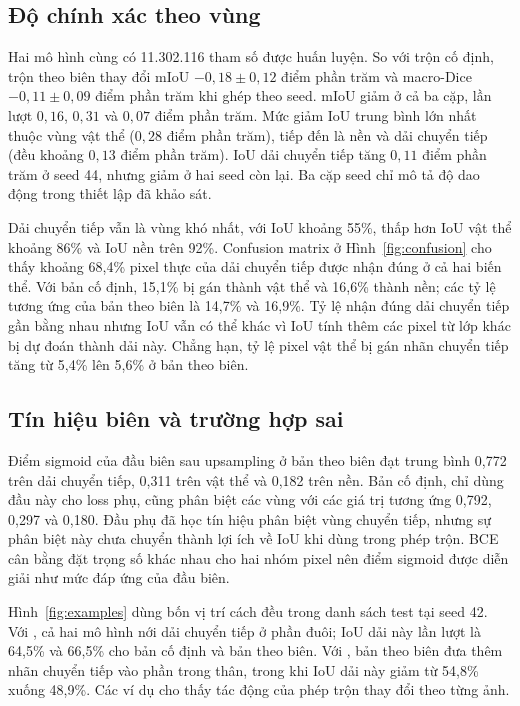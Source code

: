 \subsection{Độ chính xác theo vùng}

Hai mô hình cùng có 11.302.116 tham số được huấn luyện. So với trộn cố định, trộn theo biên thay đổi mIoU $-0{,}18\pm0{,}12$ điểm phần trăm và macro-Dice $-0{,}11\pm0{,}09$ điểm phần trăm khi ghép theo seed. mIoU giảm ở cả ba cặp, lần lượt $0{,}16$, $0{,}31$ và $0{,}07$ điểm phần trăm. Mức giảm IoU trung bình lớn nhất thuộc vùng vật thể ($0{,}28$ điểm phần trăm), tiếp đến là nền và dải chuyển tiếp (đều khoảng $0{,}13$ điểm phần trăm). IoU dải chuyển tiếp tăng $0{,}11$ điểm phần trăm ở seed 44, nhưng giảm ở hai seed còn lại. Ba cặp seed chỉ mô tả độ dao động trong thiết lập đã khảo sát.

Dải chuyển tiếp vẫn là vùng khó nhất, với IoU khoảng 55\%, thấp hơn IoU vật thể khoảng 86\% và IoU nền trên 92\%. Confusion matrix ở Hình~\ref{fig:confusion} cho thấy khoảng 68,4\% pixel thực của dải chuyển tiếp được nhận đúng ở cả hai biến thể. Với bản cố định, 15,1\% bị gán thành vật thể và 16,6\% thành nền; các tỷ lệ tương ứng của bản theo biên là 14,7\% và 16,9\%. Tỷ lệ nhận đúng dải chuyển tiếp gần bằng nhau nhưng IoU vẫn có thể khác vì IoU tính thêm các pixel từ lớp khác bị dự đoán thành dải này. Chẳng hạn, tỷ lệ pixel vật thể bị gán nhãn chuyển tiếp tăng từ 5,4\% lên 5,6\% ở bản theo biên.

\subsection{Tín hiệu biên và trường hợp sai}

Điểm sigmoid của đầu biên sau upsampling ở bản theo biên đạt trung bình 0,772 trên dải chuyển tiếp, 0,311 trên vật thể và 0,182 trên nền. Bản cố định, chỉ dùng đầu này cho loss phụ, cũng phân biệt các vùng với các giá trị tương ứng 0,792, 0,297 và 0,180. Đầu phụ đã học tín hiệu phân biệt vùng chuyển tiếp, nhưng sự phân biệt này chưa chuyển thành lợi ích về IoU khi dùng trong phép trộn. BCE cân bằng đặt trọng số khác nhau cho hai nhóm pixel nên điểm sigmoid được diễn giải như mức đáp ứng của đầu biên.

Hình~\ref{fig:examples} dùng bốn vị trí cách đều trong danh sách test tại seed 42. Với , cả hai mô hình nới dải chuyển tiếp ở phần đuôi; IoU dải này lần lượt là 64,5\% và 66,5\% cho bản cố định và bản theo biên. Với , bản theo biên đưa thêm nhãn chuyển tiếp vào phần trong thân, trong khi IoU dải này giảm từ 54,8\% xuống 48,9\%. Các ví dụ cho thấy tác động của phép trộn thay đổi theo từng ảnh.

